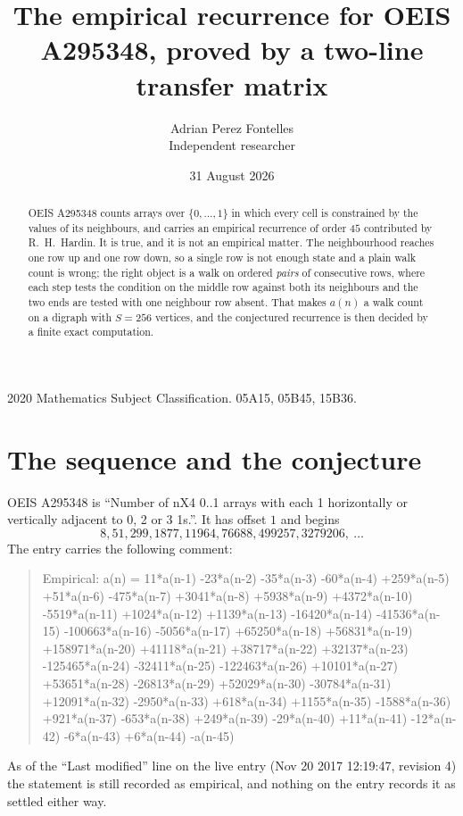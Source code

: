 \documentclass[11pt,a4paper]{article}
\title{The empirical recurrence for OEIS A295348, proved by a two-line transfer matrix}
\author{Adrian Perez Fontelles\\ \small Independent researcher}
\date{31 August 2026}
\theoremstyle{plain}
\theoremstyle{definition}
\begin{document}
\maketitle

\begin{abstract}
OEIS A295348 counts arrays over $\{0,\dots,1\}$ in which every cell is constrained by the
values of its neighbours, and carries an empirical recurrence of order $45$ contributed
by R.~H.~Hardin. It is true, and it is not an empirical matter. The neighbourhood reaches one
row up and one row down, so a single row is not enough state and a plain walk count
is wrong; the right object is a walk on ordered \emph{pairs} of consecutive rows, where
each step tests the condition on the middle row against both its neighbours and the two
ends are tested with one neighbour row absent. That makes $a(n)$ a walk count on a digraph
with $S=256$ vertices, and the conjectured recurrence is then decided by a finite exact
computation.
\end{abstract}

\noindent\small 2020 Mathematics Subject Classification. 05A15, 05B45, 15B36.\normalsize

\section{The sequence and the conjecture}

OEIS A295348 is ``Number of nX4 0..1 arrays with each 1 horizontally or vertically adjacent to 0, 2 or 3 1s.''. It has offset $1$ and begins
\[
8, 51, 299, 1877, 11964, 76688, 499257, 3279206,\ \dots
\]
The entry carries the following comment:
\begin{quote}\small
Empirical: a(n) = 11*a(n-1) -23*a(n-2) -35*a(n-3) -60*a(n-4) +259*a(n-5) +51*a(n-6) -475*a(n-7) +3041*a(n-8) +5938*a(n-9) +4372*a(n-10) -5519*a(n-11) +1024*a(n-12) +1139*a(n-13) -16420*a(n-14) -41536*a(n-15) -100663*a(n-16) -5056*a(n-17) +65250*a(n-18) +56831*a(n-19) +158971*a(n-20) +41118*a(n-21) +38717*a(n-22) +32137*a(n-23) -125465*a(n-24) -32411*a(n-25) -122463*a(n-26) +10101*a(n-27) +53651*a(n-28) -26813*a(n-29) +52029*a(n-30) -30784*a(n-31) +12091*a(n-32) -2950*a(n-33) +618*a(n-34) +1155*a(n-35) -1588*a(n-36) +921*a(n-37) -653*a(n-38) +249*a(n-39) -29*a(n-40) +11*a(n-41) -12*a(n-42) -6*a(n-43) +6*a(n-44) -a(n-45)
\end{quote}
As of the ``Last modified'' line on the live entry (Nov 20 2017 12:19:47, revision 4) the statement is
still recorded as empirical, and nothing on the entry records it as settled either way.
\end{document}
